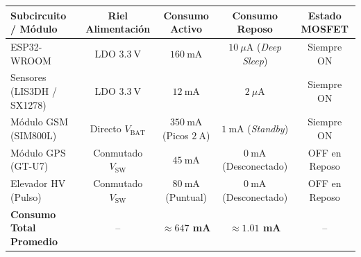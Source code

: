 \begin{table}[H]
    \centering
    \small
    \renewcommand{\arraystretch}{1.3}
    \begin{tabularx}{\linewidth}{|X|c|c|c|c|}
        \hline
        \rowcolor{gray!20}
        \textbf{Subcircuito / Módulo} & \textbf{Riel Alimentación} & \textbf{Consumo Activo} & \textbf{Consumo Reposo} & \textbf{Estado MOSFET} \\ \hline
        ESP32-WROOM & LDO $3.3~\text{V}$ & $160~\text{mA}$ & $10~\mu\text{A}$ (\textit{Deep Sleep}) & Siempre ON \\ \hline
        Sensores (LIS3DH / SX1278) & LDO $3.3~\text{V}$ & $12~\text{mA}$ & $2~\mu\text{A}$ & Siempre ON \\ \hline
        Módulo GSM (SIM800L) & Directo $V_{\text{BAT}}$ & $350~\text{mA}$ (Picos $2~\text{A}$) & $1~\text{mA}$ (\textit{Standby}) & Siempre ON \\ \hline
        Módulo GPS (GT-U7) & Conmutado $V_{\text{SW}}$ & $45~\text{mA}$ & $0~\text{mA}$ (Desconectado) & OFF en Reposo \\ \hline
        Elevador HV (Pulso) & Conmutado $V_{\text{SW}}$ & $80~\text{mA}$ (Puntual) & $0~\text{mA}$ (Desconectado) & OFF en Reposo \\ \hline
        \textbf{Consumo Total Promedio} & -- & \textbf{$\approx 647$ mA} & \textbf{$\approx 1.01$ mA} & -- \\ \hline
    \end{tabularx}
\end{table}